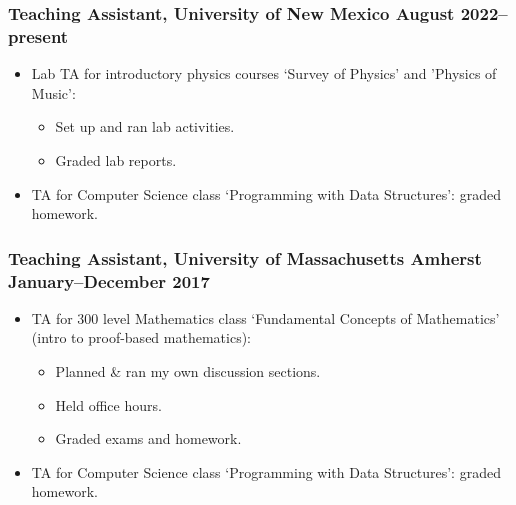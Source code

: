 \documentclass{article}
\begin{document}
		\subsubsection*{Teaching Assistant, University of New Mexico \hfill \normalfont \normalsize August 2022--present}
		\begin{itemize}[leftmargin=40pt]
			\item Lab TA for introductory physics courses `Survey of Physics' and 'Physics of Music':
			\begin{itemize}
				\item Set up and ran lab activities.
				\item Graded lab reports.
			\end{itemize}
			\item TA for Computer Science class `Programming with Data Structures': graded homework.
		\end{itemize}
		\subsubsection*{Teaching Assistant, University of Massachusetts Amherst \hfill \normalfont \normalsize January--December 2017}
			\begin{itemize}[leftmargin=40pt]
			\item TA for 300 level Mathematics class `Fundamental Concepts of Mathematics' (intro to proof-based mathematics):
			\begin{itemize}
				\item Planned \& ran my own discussion sections.
				\item Held office hours.
				\item Graded exams and homework.
			\end{itemize}
			\item TA for Computer Science class `Programming with Data Structures': graded homework.
			\end{itemize}
		
\end{document}
